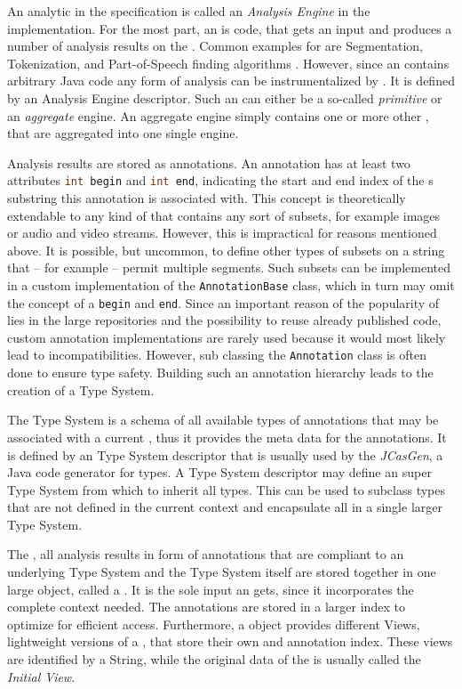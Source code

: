 An analytic in the \uima{} specification is called an \emph{Analysis Engine} in the implementation. For the most part, an \anen{} is code, that gets an input \cas{} and produces a number of analysis results on the \sofa{}. Common examples for \anens{} are Segmentation, Tokenization, and Part-of-Speech finding algorithms \cite{dkpro}. However, since an \anen{} contains arbitrary Java code any form of analysis can be instrumentalized by \uima{}. It is defined by an \xml{} Analysis Engine descriptor. Such an \anen{} can either be a so-called \emph{primitive} or an \emph{aggregate} engine. An aggregate engine simply contains one or more other \anens{}, that are aggregated into one single engine.

Analysis results are stored as annotations. An annotation has at least two attributes \lstinline[language=Java]|int begin| and \lstinline[language=Java]|int end|, indicating the start and end index of the \sofa{}s substring this annotation is associated with. This concept is theoretically extendable to any kind of \sofa{} that contains any sort of subsets, for example images or audio and video streams. However, this is impractical for reasons mentioned above. It is possible, but uncommon, to define other types of subsets on a string that -- for example -- permit multiple segments. Such subsets can be implemented in a custom implementation of the \lstinline|AnnotationBase| class, which in turn may omit the concept of a \lstinline|begin| and \lstinline|end|. Since an important reason of the popularity of \uima{} lies in the large \anen{} repositories and the possibility to reuse already published code, custom annotation implementations are rarely used because it would most likely lead to incompatibilities. However, sub classing the \lstinline|Annotation| class is often done to ensure type safety. Building such an annotation hierarchy leads to the creation of a Type System.

The Type System is a schema of all available types of annotations that may be associated with a current \sofa{}, thus it provides the meta data for the annotations. It is defined by an \xml{} Type System descriptor that is usually used by the \emph{JCasGen}, a Java code generator for \uima{} types. A \xml{} Type System descriptor may define an super Type System from which to inherit all types. This can be used to subclass types that are not defined in the current context and encapsulate all in a single larger Type System.

The \sofa{}, all analysis results in form of annotations that are compliant to an underlying Type System and the Type System itself are stored together in one large object, called a \cas{}. It is the sole input an \anen{} gets, since it incorporates the complete context needed. The annotations are stored in a larger index to optimize for efficient access. Furthermore, a \cas{} object provides different Views, lightweight versions of a \cas{}, that store their own \sofa{} and annotation index. These views are identified by a String, while the original data of the \cas{} is usually called the \emph{Initial View}.

